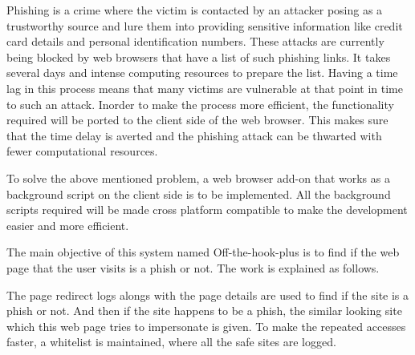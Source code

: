 \par
Phishing is a crime where the victim is contacted by an attacker posing as a trustworthy source and lure them into providing sensitive information like credit card details and personal identification numbers. These attacks are currently being blocked by web browsers that have a list of such phishing links. It takes several days and intense computing resources to prepare the list. Having a time lag in this process means that many victims are vulnerable at that point in time to such an attack. Inorder to make the process more efficient, the functionality required will be ported to the client side of the web browser. This makes sure that the time delay is averted and the phishing attack can be thwarted with fewer computational resources.
\par
To solve the above mentioned problem, a web browser add-on that works as a background script on the client side is to be implemented. All the background scripts required will be made cross platform compatible to make the development easier and more efficient.
\par
The main objective of this system named Off-the-hook-plus is to find if the web page that the user visits is a phish or not. The work is explained as follows.
\par
The page redirect logs alongs with the page details are used to find if the site is a phish or not. And then if the site happens to be a phish, the similar looking site which this web page tries to impersonate is given. To make the repeated accesses faster, a whitelist is maintained, where all the safe sites are logged.